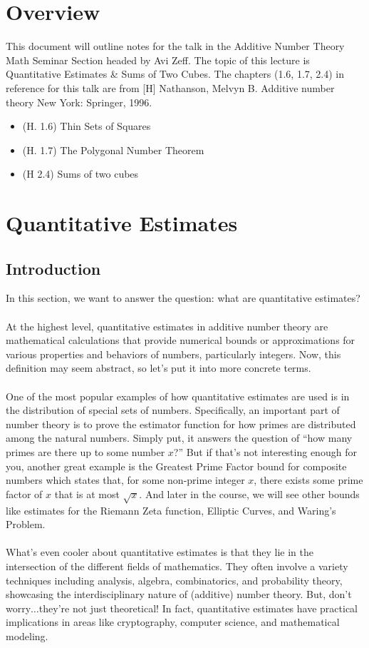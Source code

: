 
\section{Overview}
This document will outline notes for the talk in the Additive Number Theory Math Seminar Section headed by Avi Zeff. The topic of this lecture is Quantitative Estimates & Sums of Two Cubes. The chapters (1.6, 1.7, 2.4) in reference for this talk are from [H] Nathanson, Melvyn B. Additive number theory New York: Springer, 1996. 
\begin{itemize}
    \item (H. 1.6) Thin Sets of Squares
    \item (H. 1.7) The Polygonal Number Theorem
    \item (H 2.4) Sums of two cubes
\end{itemize}
\section{Quantitative Estimates}
\subsection{Introduction}
In this section, we want to answer the question: what are quantitative estimates? \\
\\
At the highest level, quantitative estimates in additive number theory are mathematical calculations that provide numerical bounds or approximations for various properties and behaviors of numbers, particularly integers. Now, this definition may seem abstract, so let's put it into more concrete terms.\\
\\
One of the most popular examples of how quantitative estimates are used is in the distribution of special sets of numbers. Specifically, an important part of number theory is to prove the estimator function for how primes are distributed among the natural numbers. Simply put, it answers the question of ``how many primes are there up to some number $x$?'' But if that's not interesting enough for you, another great example is the Greatest Prime Factor bound for composite numbers which states that, for some non-prime integer $x$, there exists some prime factor of $x$ that is at most $\sqrt{x}$. And later in the course, we will see other bounds like estimates for the Riemann Zeta function, Elliptic Curves, and Waring's Problem. \\
\\
What's even cooler about quantitative estimates is that they lie in the intersection of the different fields of mathematics. They often involve a variety techniques including analysis, algebra, combinatorics, and probability theory, showcasing the interdisciplinary nature of (additive) number theory. But, don't worry$\dots$they're not just theoretical! In fact, quantitative estimates have practical implications in areas like cryptography, computer science, and mathematical modeling.
